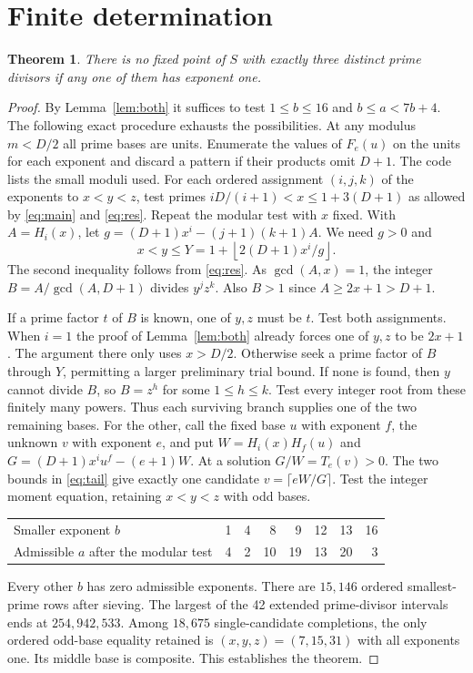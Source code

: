 \documentclass[11pt]{article}
\newtheorem{theorem}{Theorem}
\begin{document}
\section{Finite determination}
\begin{theorem}
There is no fixed point of $S$ with exactly three distinct prime
divisors if any one of them has exponent one.
\end{theorem}
\begin{proof}
By Lemma~\ref{lem:both} it suffices to test $1\le b\le16$ and
$b\le a<7b+4$. The following exact procedure exhausts the possibilities.
At any modulus $m<D/2$ all prime bases are units. Enumerate the
values of $F_e(u)$ on the units for each exponent and discard a
pattern if their products omit $D+1$. The code lists the small
moduli used. For each ordered assignment $(i,j,k)$ of the exponents
to $x<y<z$, test primes $iD/(i+1)<x\le1+3(D+1)$ as allowed by
\eqref{eq:main} and \eqref{eq:res}. Repeat the modular test with
$x$ fixed. With $A=H_i(x)$, let $g=(D+1)x^i-(j+1)(k+1)A$.
We need $g>0$ and
\[
 x<y\le Y=1+\left\lfloor2(D+1)x^i/g\right\rfloor .
\]
The second inequality follows from \eqref{eq:res}. As $\gcd(A,x)=1$,
the integer $B=A/\gcd(A,D+1)$ divides $y^jz^k$. Also $B>1$ since
$A\ge2x+1>D+1$.

If a prime factor $t$ of $B$ is known, one of $y,z$ must be $t$.
Test both assignments. When $i=1$ the proof of Lemma~\ref{lem:both}
already forces one of $y,z$ to be $2x+1$. The argument there only
uses $x>D/2$.
Otherwise seek a prime factor of $B$ through $Y$, permitting a
larger preliminary trial bound. If none is found, then $y$ cannot
divide $B$, so $B=z^h$ for some $1\le h\le k$. Test every
integer root from these finitely many powers. Thus each surviving
branch supplies one of the two remaining bases.
For the other, call the fixed base $u$ with exponent $f$, the
unknown $v$ with exponent $e$, and put
$W=H_i(x)H_f(u)$ and $G=(D+1)x^iu^f-(e+1)W$.
At a solution $G/W=T_e(v)>0$. The two bounds in \eqref{eq:tail}
give exactly one candidate $v=\lceil eW/G\rceil$. Test the integer
moment equation, retaining $x<y<z$ with odd bases.

\begin{center}
\begin{tabular}{lrrrrrrr}
\toprule
Smaller exponent $b$ & 1&4&8&9&12&13&16\\
Admissible $a$ after the modular test &4&2&10&19&13&20&3\\
\bottomrule
\end{tabular}
\end{center}
Every other $b$ has zero admissible exponents. There are $15{,}146$
ordered smallest-prime rows after sieving. The largest of the 42
extended prime-divisor intervals ends at $254{,}942{,}533$.
Among $18{,}675$ single-candidate completions, the only ordered
odd-base equality retained is $(x,y,z)=(7,15,31)$ with all
exponents one. Its middle base is composite. This establishes the
theorem.
\end{proof}
\end{document}
